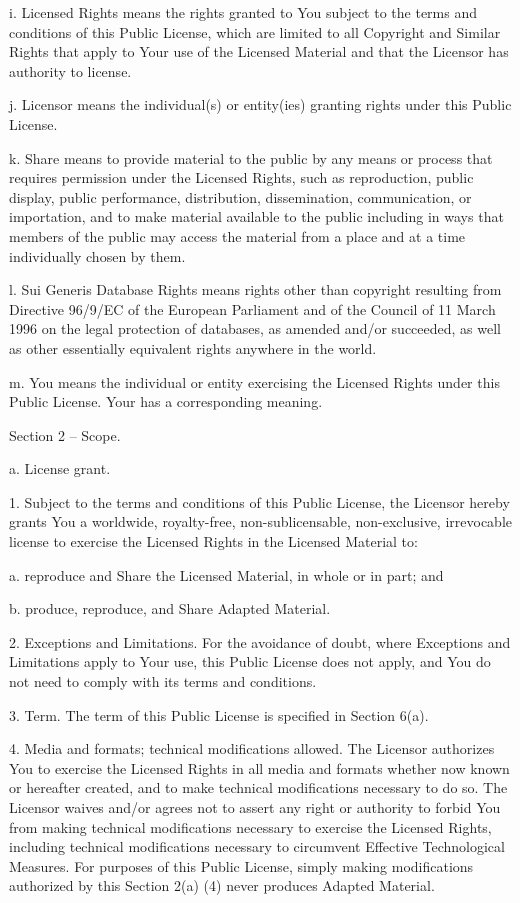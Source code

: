   i. Licensed Rights means the rights granted to You subject to the
     terms and conditions of this Public License, which are limited to
     all Copyright and Similar Rights that apply to Your use of the
     Licensed Material and that the Licensor has authority to license.

  j. Licensor means the individual(s) or entity(ies) granting rights
     under this Public License.

  k. Share means to provide material to the public by any means or
     process that requires permission under the Licensed Rights, such
     as reproduction, public display, public performance, distribution,
     dissemination, communication, or importation, and to make material
     available to the public including in ways that members of the
     public may access the material from a place and at a time
     individually chosen by them.

  l. Sui Generis Database Rights means rights other than copyright
     resulting from Directive 96/9/EC of the European Parliament and of
     the Council of 11 March 1996 on the legal protection of databases,
     as amended and/or succeeded, as well as other essentially
     equivalent rights anywhere in the world.

  m. You means the individual or entity exercising the Licensed Rights
     under this Public License. Your has a corresponding meaning.


Section 2 -- Scope.

  a. License grant.

       1. Subject to the terms and conditions of this Public License,
          the Licensor hereby grants You a worldwide, royalty-free,
          non-sublicensable, non-exclusive, irrevocable license to
          exercise the Licensed Rights in the Licensed Material to:

            a. reproduce and Share the Licensed Material, in whole or
               in part; and

            b. produce, reproduce, and Share Adapted Material.

       2. Exceptions and Limitations. For the avoidance of doubt, where
          Exceptions and Limitations apply to Your use, this Public
          License does not apply, and You do not need to comply with
          its terms and conditions.

       3. Term. The term of this Public License is specified in Section
          6(a).

       4. Media and formats; technical modifications allowed. The
          Licensor authorizes You to exercise the Licensed Rights in
          all media and formats whether now known or hereafter created,
          and to make technical modifications necessary to do so. The
          Licensor waives and/or agrees not to assert any right or
          authority to forbid You from making technical modifications
          necessary to exercise the Licensed Rights, including
          technical modifications necessary to circumvent Effective
          Technological Measures. For purposes of this Public License,
          simply making modifications authorized by this Section 2(a)
          (4) never produces Adapted Material.

